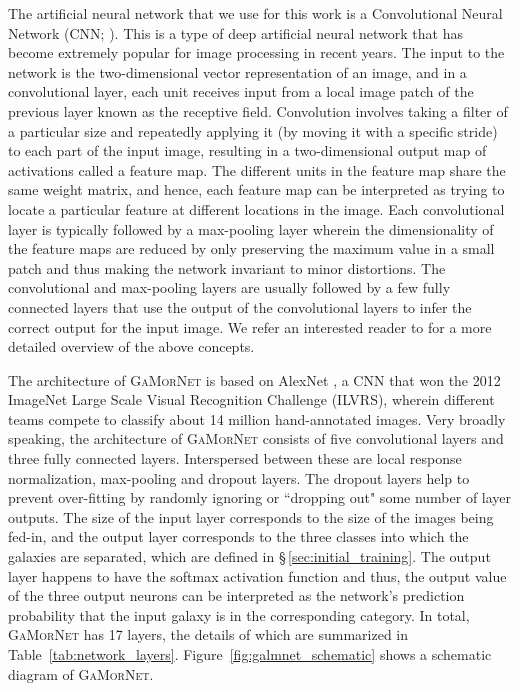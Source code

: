 \documentclass[twocolumn]{aastex63}
\newcommand\gamornet{G\textsc{a}M\textsc{or}N\textsc{et}}
\begin{document}
The artificial neural network that we use for this work is a Convolutional Neural Network (CNN; \citealp{fukushima_80, lecun_98}). This is a type of deep artificial neural network that has become extremely popular for image processing in recent years. The input to the network is the two-dimensional vector representation of an image, and in a convolutional layer, each unit receives input from a local image patch of the previous layer known as the receptive field. Convolution involves taking a filter of a particular size and repeatedly applying it (by moving it with a specific stride) to each part of the input image, resulting in a two-dimensional output map of activations called a feature map. The different units in the feature map share the same weight matrix, and hence, each feature map can be interpreted as trying to locate a particular feature at different locations in the image. Each convolutional layer is typically followed by a max-pooling layer wherein the dimensionality of the feature maps are reduced by only preserving the maximum value in a small patch and thus making the network invariant to minor distortions. The convolutional and max-pooling layers are usually followed by a few fully connected layers that use the output of the convolutional layers to infer the correct output for the input image. We refer an interested reader to \citet{nielsen} for a more detailed overview of the above concepts.

The architecture of \gamornet{} is based on AlexNet \citep{alexnet}, a CNN that won the 2012 ImageNet Large Scale Visual Recognition Challenge (ILVRS), wherein different teams compete to classify about 14 million hand-annotated images. Very broadly speaking, the architecture of \gamornet{} consists of five convolutional layers and three fully connected layers. Interspersed between these are local response normalization, max-pooling and dropout layers. The dropout layers help to prevent over-fitting by randomly ignoring or ``dropping out" some number of layer outputs. The size of the input layer corresponds to the size of the images being fed-in, and the output layer corresponds to the three classes into which the galaxies are separated, which are defined in \S\,\ref{sec:initial_training}. The output layer happens to have the softmax activation function and thus, the output value of the three output neurons can be interpreted as the network's prediction probability that the input galaxy is in the corresponding category. In total, \gamornet{} has 17 layers, the details of which are summarized in Table~\ref{tab:network_layers}. Figure~\ref{fig:galmnet_schematic} shows a schematic diagram of \gamornet{}.
\end{document}
